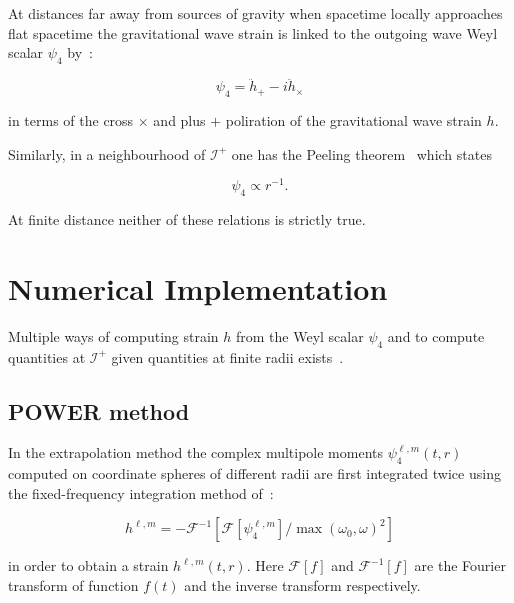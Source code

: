 At distances far away from sources of gravity when spacetime locally
approaches flat spacetime the gravitational wave strain is linked to the
outgoing wave Weyl scalar $\psi_4$ by~\cite{POWER-Reisswig:2010di}:

\begin{equation}
\psi_4 = \ddot h_{+} - i \ddot h_{\times}
\label{eqn:psi4fromstrain}
\end{equation}

in terms of the cross $\times$ and plus $+$ poliration of the gravitational
wave strain $h$.

Similarly, in a neighbourhood of $\mathcal{I}^+$ one has the Peeling
theorem~\cite{POWER-Wald:1984rg,POWER-Hinder:2011xx} which states

\begin{equation}
\psi_4 \propto r^{-1} \textrm{.}
\label{eqn:peeling}
\end{equation}

At finite distance neither of these relations is strictly true.

\section{Numerical Implementation}

Multiple ways of computing strain $h$ from the Weyl scalar $\psi_4$ and to
compute quantities at $\mathcal{I}^+$ given quantities at finite radii
exists~\cite{POWER-Taylor:2013zia, POWER-Nakano:2015pta}.

\subsection{POWER method}\label{sec:power-method}

In the extrapolation method the complex multipole moments
$\psi_4^{\ell,m}(t,r)$ computed on coordinate spheres of different radii are
first integrated twice using the fixed-frequency integration method
of~\cite{POWER-Reisswig:2010di}:

\begin{equation}
h^{\ell,m} =
-\mathcal{F}^{-1}\left[
  \mathcal{F}\left[\psi_4^{\ell,m}\right] /
  \mathop{max}(\omega_0,\omega)^2
\right]
\label{eqn:ffi}
\end{equation}

in order to obtain a strain $h^{\ell,m}(t,r)$. Here $\mathcal{F}[f]$ and
$\mathcal{F}^{-1}[f]$ are the
Fourier transform of function $f(t)$ and the inverse transform respectively.

